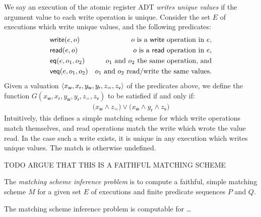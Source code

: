 \begin{example}

  We say an execution of the atomic register ADT \emph{writes unique values}
  if the argument value to each write operation is unique. Consider the set $E$
  of executions which write unique values, and the following predicates:
  \begin{align*}
    & \mathsf{write}(e,o) & \text{$o$ is a {\sf write} operation in $e$}, \\
    & \mathsf{read}(e,o) & \text{$o$ is a {\sf read} operation in $e$,} \\
    & \mathsf{eq}(e,o_1,o_2) & \text{$o_1$ and $o_2$ the same operation, and} \\
    & \mathsf{veq}(e,o_1,o_2) & \text{$o_1$ and $o_2$ read/write the same values.}
  \end{align*}
  Given a valuation ${\left\langle{x_\mathsf{w}, x_\mathsf{r}, y_\mathsf{w},
  y_\mathsf{r}, z_\mathsf{=}, z_\mathsf{v}}\right\rangle}$ of the predicates above, we define
  the function $G(x_\mathsf{w}, x_\mathsf{r}, y_\mathsf{w}, y_\mathsf{r},
  z_\mathsf{=}, z_\mathsf{v})$ to be satisfied if and only if:
  \begin{align*}
    \big( x_\mathsf{w} \land z_\mathsf{=} \big)
    \lor \big( x_\mathsf{w} \land y_\mathsf{r} \land z_\mathsf{v} \big)
  \end{align*}
  Intuitively, this defines a simple matching scheme for which write operations
  match themselves, and read operations match the write which wrote the value
  read. In the case such a write exists, it is unique in any execution which
  writes unique values. The match is otherwise undefined.

  TODO ARGUE THAT THIS IS A FAITHFUL MATCHING SCHEME 

\end{example}

\begin{definition}

  The \emph{matching scheme inference problem} is to compute a faithful, simple
  matching scheme $M$ for a given set $E$ of executions and finite predicate
  sequences $P$ and $Q$.

\end{definition}

\begin{theorem}

  The matching scheme inference problem is computable for \ldots

\end{theorem}
